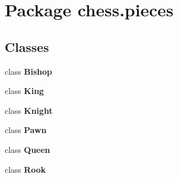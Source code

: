 \section{Package chess.\+pieces}
\label{namespacechess_1_1pieces}
\subsection*{Classes}
\begin{DoxyCompactItemize}
\item 
class {\bf Bishop}
\item 
class {\bf King}
\item 
class {\bf Knight}
\item 
class {\bf Pawn}
\item 
class {\bf Queen}
\item 
class {\bf Rook}
\end{DoxyCompactItemize}
